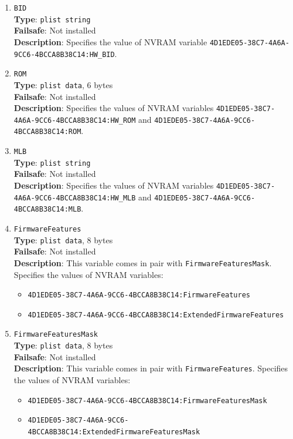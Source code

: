 \documentclass[]{article}
\providecommand{\tightlist}{%
  \setlength{\itemsep}{0pt}\setlength{\parskip}{0pt}}
\begin{document}
\begin{enumerate}
\item
  \texttt{BID}\\
  \textbf{Type}: \texttt{plist\ string}\\
  \textbf{Failsafe}: Not installed\\
  \textbf{Description}: Specifies the value of NVRAM variable
  \texttt{4D1EDE05-38C7-4A6A-9CC6-4BCCA8B38C14:HW\_BID}.

\item
  \texttt{ROM}\\
  \textbf{Type}: \texttt{plist\ data}, 6 bytes\\
  \textbf{Failsafe}: Not installed\\
  \textbf{Description}: Specifies the values of NVRAM variables
  \texttt{4D1EDE05-38C7-4A6A-9CC6-4BCCA8B38C14:HW\_ROM} and
  \texttt{4D1EDE05-38C7-4A6A-9CC6-4BCCA8B38C14:ROM}.

\item
  \texttt{MLB}\\
  \textbf{Type}: \texttt{plist\ string}\\
  \textbf{Failsafe}: Not installed\\
  \textbf{Description}: Specifies the values of NVRAM variables
  \texttt{4D1EDE05-38C7-4A6A-9CC6-4BCCA8B38C14:HW\_MLB} and
  \texttt{4D1EDE05-38C7-4A6A-9CC6-4BCCA8B38C14:MLB}.

\item
  \texttt{FirmwareFeatures}\\
  \textbf{Type}: \texttt{plist\ data}, 8 bytes\\
  \textbf{Failsafe}: Not installed\\
  \textbf{Description}: This variable comes in pair with \texttt{FirmwareFeaturesMask}.
  Specifies the values of NVRAM variables:
  \begin{itemize}
  \tightlist
  \item \texttt{4D1EDE05-38C7-4A6A-9CC6-4BCCA8B38C14:FirmwareFeatures}
  \item \texttt{4D1EDE05-38C7-4A6A-9CC6-4BCCA8B38C14:ExtendedFirmwareFeatures}
  \end{itemize}

\item
  \texttt{FirmwareFeaturesMask}\\
  \textbf{Type}: \texttt{plist\ data}, 8 bytes\\
  \textbf{Failsafe}: Not installed\\
  \textbf{Description}: This variable comes in pair with \texttt{FirmwareFeatures}.
  Specifies the values of NVRAM variables:
  \begin{itemize}
  \tightlist
  \item \texttt{4D1EDE05-38C7-4A6A-9CC6-4BCCA8B38C14:FirmwareFeaturesMask}
  \item \texttt{4D1EDE05-38C7-4A6A-9CC6-4BCCA8B38C14:ExtendedFirmwareFeaturesMask}
  \end{itemize}

\end{enumerate}
\end{document}
